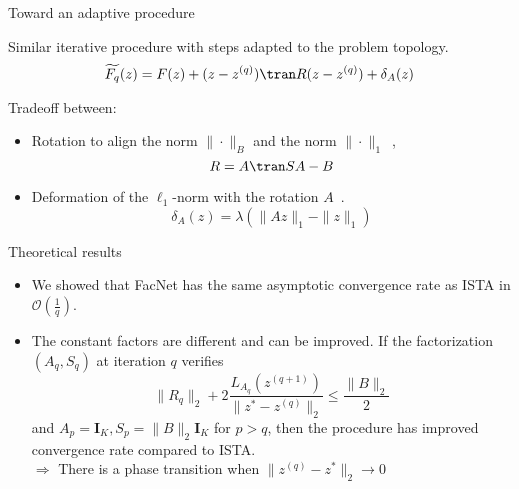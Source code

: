 \documentclass[prez_parietal.tex]{subfiles}
\begin{document}
\begin{frame}{Toward an adaptive procedure}

	Similar iterative procedure with steps adapted to the problem topology.
	\[
		\widetilde{F_q}(z) = F(z) + (z-z^{(q)})\tran R(z-z^{(q)}) + \delta_A(z)
	\]


	Tradeoff between:\\[.3em]
	\begin{itemize}\itemsep1em
		\item Rotation to align the norm $\|\cdot\|_B$ and the norm $\|\cdot\|_1$~,
		\[ R = A\tran SA - B\]
		\item Deformation of the $\ell_1$-norm with the rotation $A$~.
		\[ \delta_A(z) = \lambda\left(\|Az\|_1-\|z\|_1\right) \]
	\end{itemize}
\end{frame}



\begin{frame}{Theoretical results}
    \begin{itemize}\itemsep1em
		\item We showed that FacNet has the same asymptotic convergence rate as ISTA
		in $\mathcal O(\tfrac{1}{q})$.
		\item The constant factors are different and can be improved.
		If the factorization $(A_q, S_q)$ at iteration $q$  verifies
			\[
				\|R_q\|_2 + 2 \frac{L_{A_q}(z^{(q+1)})}{\|z^*-z^{(q)}\|_2} \le \frac{\|B\|_2}{2}
			\]
			and $A_p = \pmb I_K, S_p = \|B\|_2\pmb I_K$ for $p > q$, then the procedure has
			improved convergence rate compared to ISTA.\\[1em]
			{{$\Rightarrow$}} There is a phase transition when
			 $\|z^{(q)} - z^*\|_2 \to 0$
	\end{itemize}
\end{frame}
\end{document}
